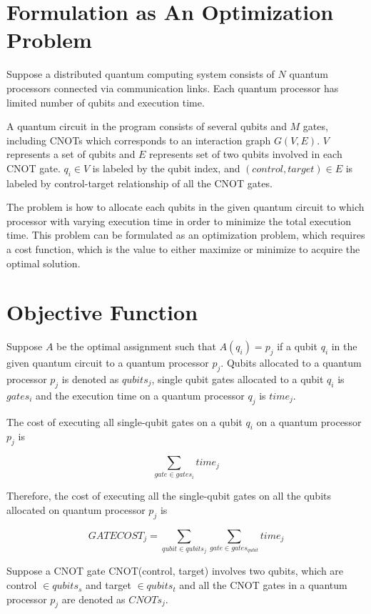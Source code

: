 \section{Formulation as An Optimization Problem}

Suppose a distributed quantum computing system consists of $N$ quantum processors connected via communication links. Each quantum processor has limited number of qubits and execution time.

A quantum circuit in the program consists of several qubits and $M$ gates, including CNOTs which corresponds to an interaction graph $G(V, E)$. $V$ represents a set of qubits and $E$ represents set of two qubits involved in each CNOT gate.  $q_i \in V$ is labeled by the qubit index, and $(control, target) \in E$ is labeled by control-target relationship of all the CNOT gates.

The problem is how to allocate each qubits in the given quantum circuit to which processor with varying execution time in order to minimize the total execution time. This problem can be formulated as an optimization problem, which requires a cost function, which is the value to either maximize or minimize to acquire the optimal solution.

\section{Objective Function}
Suppose $A$ be the optimal assignment such that $A(q_i) = p_j$ if a qubit $q_i$ in the given quantum circuit to a quantum processor $p_j$. Qubits allocated to a quantum processor $p_j$ is denoted as $qubits_j$, single qubit gates allocated to a qubit $q_i$ is $gates_i$ and the execution time on a quantum processor $q_j$ is $time_j$.

The cost of executing all single-qubit gates on a qubit $q_i$ on a quantum processor $p_j$ is 

 \begin{equation}
\sum_{gate \in gates_i} time_j
 \end{equation}
 
Therefore, the cost of executing all the single-qubit gates on all the qubits allocated on quantum processor $p_j$ is 

 \begin{equation}
GATECOST_j = \sum_{qubit \in qubits_j} \sum_{gate \in gates_{qubit}} time_j
 \end{equation}

Suppose a CNOT gate CNOT(control, target) involves two qubits, which are control $\in qubits_s$ and target $\in qubits_t$ and all the CNOT gates in a quantum processor $p_j$ are denoted as $CNOTs_{j}$.

